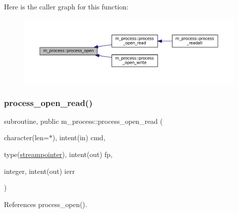 Here is the caller graph for this function\+:
\nopagebreak
\begin{figure}[H]
\begin{center}
\leavevmode
\includegraphics[width=350pt]{namespacem__process_a3c0f543a9ceff2671041d73660f60a59_icgraph}
\end{center}
\end{figure}
\mbox{\label{namespacem__process_aaaf4d1926258a4cec7da7fc61c38c79d}} 
\subsubsection{\texorpdfstring{process\+\_\+open\+\_\+read()}{process\_open\_read()}}
{\footnotesize\ttfamily subroutine, public m\+\_\+process\+::process\+\_\+open\+\_\+read (\begin{DoxyParamCaption}\item[{character(len=$\ast$), intent(in)}]{cmd,  }\item[{type(\mbox{\hyperlink{structm__process_1_1streampointer}{streampointer}}), intent(out)}]{fp,  }\item[{integer, intent(out)}]{ierr }\end{DoxyParamCaption})}



References process\+\_\+open().

